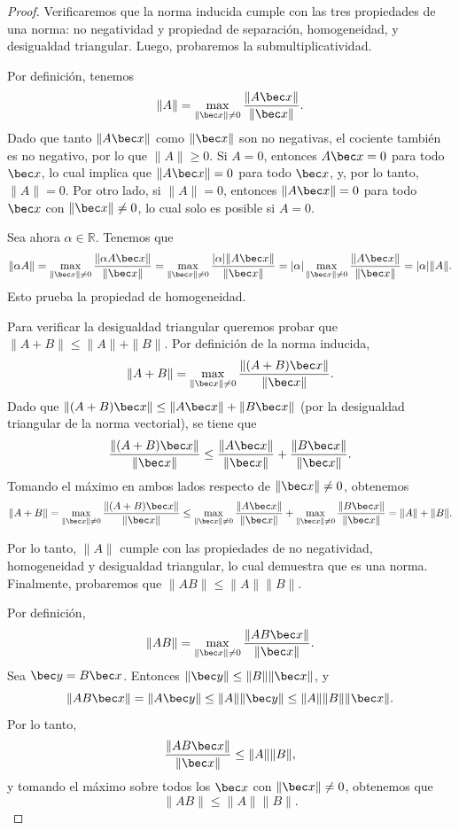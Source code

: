 \begin{proof}
     Verificaremos que la norma inducida cumple con las tres propiedades de una norma: no negatividad y propiedad de separación, homogeneidad, y desigualdad triangular. Luego, probaremos la submultiplicatividad.



        Por definición, tenemos
        \[
        \|A\| = \max_{\|\bec x\| \neq 0} \frac{\|A\bec x\|}{\|\bec x\|}.
        \]
        Dado que tanto \(\|A\bec x\|\) como \(\|\bec x\|\) son no negativas, el cociente también es no negativo, por lo que \(\|A\| \geq 0\).
Si \(A = 0\), entonces \(A\bec x = 0\) para todo \(\bec x\), lo cual implica que \(\|A\bec x\| = 0\) para todo \(\bec x\), y, por lo tanto, \(\|A\| = 0\).
Por otro lado, si \(\|A\| = 0\), entonces \(\|A\bec x\| = 0\) para todo \(\bec x\) con \(\|\bec x\| \neq 0\), lo cual solo es posible si \(A = 0\). 

 
        Sea ahora \(\alpha \in \mathbb{R}\). Tenemos que
        \[
        \|\alpha A\| = \max_{\|\bec x\| \neq 0} \frac{\|\alpha A \bec x\|}{\|\bec x\|} = \max_{\|\bec x\| \neq 0} \frac{|\alpha| \|A\bec x\|}{\|\bec x\|} = |\alpha| \max_{\|\bec x\| \neq 0} \frac{\|A\bec x\|}{\|\bec x\|} = |\alpha| \|A\|.
        \]
        Esto prueba la propiedad de homogeneidad.


        Para verificar la desigualdad triangular queremos probar que \(\|A + B\| \leq \|A\| + \|B\|\). Por definición de la norma inducida,
        \[
        \|A + B\| = \max_{\|\bec x\| \neq 0} \frac{\|(A + B)\bec x\|}{\|\bec x\|}.
        \]
        Dado que \(\|(A + B)\bec x\| \leq \|A\bec x\| + \|B\bec x\|\) (por la desigualdad triangular de la norma vectorial), se tiene que
        \[
        \frac{\|(A + B)\bec x\|}{\|\bec x\|} \leq \frac{\|A\bec x\|}{\|\bec x\|} + \frac{\|B\bec x\|}{\|\bec x\|}.
        \]
        Tomando el máximo en ambos lados respecto de \(\|\bec x\| \neq 0\), obtenemos
        \[
        \|A + B\| = \max_{\|\bec x\| \neq 0} \frac{\|(A + B)\bec x\|}{\|\bec x\|} \leq \max_{\|  \bec x\| \neq 0} \frac{\|A\bec x\|}{\|\bec x\|} + \max_{\|\bec x\| \neq 0} \frac{\|B\bec x\|}{\|\bec x\|} = \|A\| + \|B\|.
        \]


    Por lo tanto, \(\|A\|\) cumple con las propiedades de no negatividad, homogeneidad y desigualdad triangular, lo cual demuestra que es una norma.
    Finalmente, probaremos que \(\|AB\| \leq \|A\| \|B\|\).

    Por definición,
    \[
    \|AB\| = \max_{\|\bec x\| \neq 0} \frac{\|AB \bec x\|}{\|\bec x\|}.
    \]
    Sea \(\bec y = B\bec x\). Entonces \(\|\bec y\| \leq \|B\| \|\bec x\|\), y
    \[
    \|AB \bec x\| = \|A \bec y\| \leq \|A\| \|\bec y\| \leq \|A\| \|B\| \|\bec x\|.
    \]
    Por lo tanto,
    \[
    \frac{\|AB \bec x\|}{\|\bec x\|} \leq \|A\| \|B\|,
    \]
    y tomando el máximo sobre todos los \(\bec x\) con \(\|\bec x\| \neq 0\), obtenemos que
    \[
    \|AB\| \leq \|A\| \|B\|.
    \]
\end{proof}


